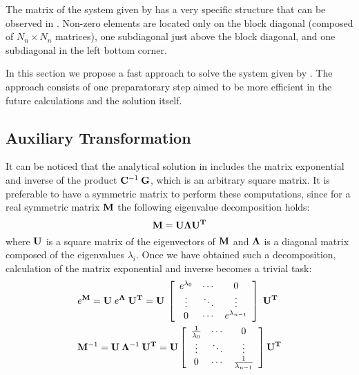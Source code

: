 The matrix of the system given by  has a very specific structure that can be observed in . Non-zero elements are located only on the block diagonal (composed of $N_n \times N_n$ matrices), one subdiagonal just above the block diagonal, and one subdiagonal in the left bottom corner.

In this section we propose a fast approach to solve the system given by . The approach consists of one preparatorary step aimed to be more efficient in the future calculations and the solution itself.

\subsection{Auxiliary Transformation}
It can be noticed that the analytical solution in  includes the matrix exponential and inverse of the product $\mathbf{\mathbf{C}}^{-1} \: \mathbf{\mathbf{G}}$, which is an arbitrary square matrix. It is preferable to have a symmetric matrix to perform these computations, since for a real symmetric matrix $\mathbf{M}$ the following eigenvalue decomposition holds:
\begin{equation} \label{eq:eigenvalue-decomposition}
  \mathbf{M} = \mathbf{\mathbf{U}} \mathbf{\Lambda} \mathbf{\mathbf{U}}^{\mathbf{T}}
\end{equation}
where $\mathbf{\mathbf{U}}$ is a square matrix of the eigenvectors of $\mathbf{M}$ and $\mathbf{\Lambda}$ is a diagonal matrix composed of the eigenvalues $\lambda_i$. Once we have obtained such a decomposition, calculation of the matrix exponential and inverse becomes a trivial task:
\begin{align*}
  & e^{\mathbf{M}} = \mathbf{\mathbf{U}} \; e^{\mathbf{\Lambda}} \; \mathbf{\mathbf{U}}^{\mathbf{T}} = \mathbf{\mathbf{U}}\: \left[
      \begin{array}{ccc}
        e^{\lambda_0} & \cdots & 0 \\
        \vdots & \ddots & \vdots \\
        0 & \cdots & e^{\lambda_{n - 1}}
      \end{array}
    \right] \; \mathbf{\mathbf{U}}^{\mathbf{T}} \\
  & \mathbf{M}^{-1} = \mathbf{\mathbf{U}} \: \mathbf{\Lambda}^{-1} \: \mathbf{\mathbf{U}}^{\mathbf{T}} = \mathbf{\mathbf{U}} \left[
      \begin{array}{ccc}
        \frac{1}{\lambda_0} & \cdots & 0 \\
        \vdots & \ddots & \vdots \\
        0 & \cdots & \frac{1}{\lambda_{n - 1}}
      \end{array}
    \right] \mathbf{\mathbf{U}}^{\mathbf{T}} \\
\end{align*}
